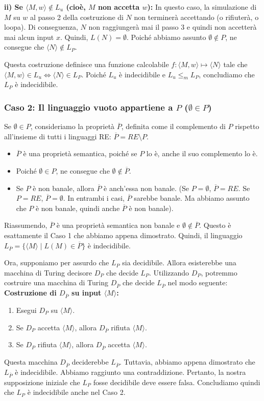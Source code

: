 \documentclass[a4paper]{article}
\begin{document}
\textbf{ii) Se $\langle M,w \rangle \notin L_u$ (cioè, $M$ non accetta $w$):}
In questo caso, la simulazione di $M$ su $w$ al passo 2 della costruzione di $N$ non terminerà accettando (o rifiuterà, o loopa). Di conseguenza, $N$ non raggiungerà mai il passo 3 e quindi non accetterà mai alcun input $x$.
Quindi, $L(N) = \emptyset$.
Poiché abbiamo assunto $\emptyset \notin P$, ne consegue che $\langle N \rangle \notin L_P$.

Questa costruzione definisce una funzione calcolabile $f: \langle M,w \rangle \mapsto \langle N \rangle$ tale che $\langle M,w \rangle \in L_u \iff \langle N \rangle \in L_P$. Poiché $L_u$ è indecidibile e $L_u \le_m L_P$, concludiamo che $L_P$ è indecidibile.

\subsubsection{Caso 2: Il linguaggio vuoto appartiene a $P$ ($\emptyset \in P$)}
Se $\emptyset \in P$, consideriamo la proprietà $\overline{P}$, definita come il complemento di $P$ rispetto all'insieme di tutti i linguaggi RE: $\overline{P} = RE \setminus P$.
\begin{itemize}
    \item $\overline{P}$ è una proprietà semantica, poiché se $P$ lo è, anche il suo complemento lo è.
    \item Poiché $\emptyset \in P$, ne consegue che $\emptyset \notin \overline{P}$.
    \item Se $P$ è non banale, allora $\overline{P}$ è anch'essa non banale. (Se $P = \emptyset$, $\overline{P} = RE$. Se $P = RE$, $\overline{P} = \emptyset$. In entrambi i casi, $\overline{P}$ sarebbe banale. Ma abbiamo assunto che $P$ è non banale, quindi anche $\overline{P}$ è non banale).
\end{itemize}
Riassumendo, $\overline{P}$ è una proprietà semantica non banale e $\emptyset \notin \overline{P}$. Questo è esattamente il Caso 1 che abbiamo appena dimostrato. Quindi, il linguaggio $L_{\overline{P}} = \{\langle M \rangle \mid L(M) \in \overline{P}\}$ è indecidibile.

Ora, supponiamo per assurdo che $L_P$ sia decidibile. Allora esisterebbe una macchina di Turing decisore $D_P$ che decide $L_P$.
Utilizzando $D_P$, potremmo costruire una macchina di Turing $D_{\overline{P}}$ che decide $L_{\overline{P}}$ nel modo seguente:
\textbf{Costruzione di $D_{\overline{P}}$ su input $\langle M \rangle$:}
\begin{enumerate}
    \item Esegui $D_P$ su $\langle M \rangle$.
    \item Se $D_P$ accetta $\langle M \rangle$, allora $D_{\overline{P}}$ rifiuta $\langle M \rangle$.
    \item Se $D_P$ rifiuta $\langle M \rangle$, allora $D_{\overline{P}}$ accetta $\langle M \rangle$.
\end{enumerate}
Questa macchina $D_{\overline{P}}$ deciderebbe $L_{\overline{P}}$. Tuttavia, abbiamo appena dimostrato che $L_{\overline{P}}$ è indecidibile. Abbiamo raggiunto una contraddizione.
Pertanto, la nostra supposizione iniziale che $L_P$ fosse decidibile deve essere falsa. Concludiamo quindi che $L_P$ è indecidibile anche nel Caso 2.
\end{document}
